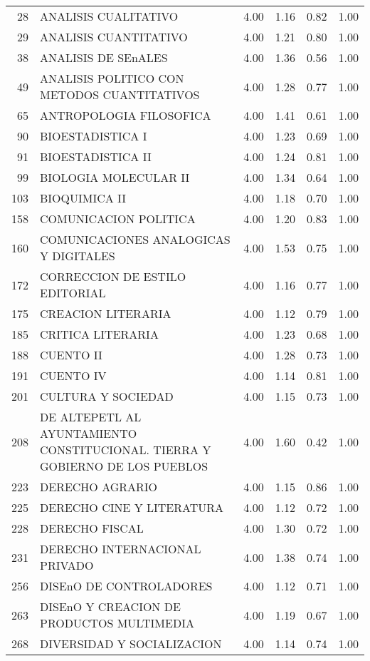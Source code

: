 \documentclass[12pt]{article}
\begin{document}
\begin{table}[ht]
\begin{tabular}{rlrrrr}
  28 & ANALISIS CUALITATIVO & 4.00 & 1.16 & 0.82 & 1.00 \\ 
  29 & ANALISIS CUANTITATIVO & 4.00 & 1.21 & 0.80 & 1.00 \\ 
  38 & ANALISIS DE SEnALES & 4.00 & 1.36 & 0.56 & 1.00 \\ 
  49 & ANALISIS POLITICO CON METODOS CUANTITATIVOS & 4.00 & 1.28 & 0.77 & 1.00 \\ 
  65 & ANTROPOLOGIA FILOSOFICA & 4.00 & 1.41 & 0.61 & 1.00 \\ 
  90 & BIOESTADISTICA I & 4.00 & 1.23 & 0.69 & 1.00 \\ 
  91 & BIOESTADISTICA II & 4.00 & 1.24 & 0.81 & 1.00 \\ 
  99 & BIOLOGIA MOLECULAR II & 4.00 & 1.34 & 0.64 & 1.00 \\ 
  103 & BIOQUIMICA II & 4.00 & 1.18 & 0.70 & 1.00 \\ 
  158 & COMUNICACION POLITICA & 4.00 & 1.20 & 0.83 & 1.00 \\ 
  160 & COMUNICACIONES ANALOGICAS Y DIGITALES & 4.00 & 1.53 & 0.75 & 1.00 \\ 
  172 & CORRECCION DE ESTILO EDITORIAL & 4.00 & 1.16 & 0.77 & 1.00 \\ 
  175 & CREACION LITERARIA & 4.00 & 1.12 & 0.79 & 1.00 \\ 
  185 & CRITICA LITERARIA & 4.00 & 1.23 & 0.68 & 1.00 \\ 
  188 & CUENTO II & 4.00 & 1.28 & 0.73 & 1.00 \\ 
  191 & CUENTO IV & 4.00 & 1.14 & 0.81 & 1.00 \\ 
  201 & CULTURA Y SOCIEDAD & 4.00 & 1.15 & 0.73 & 1.00 \\ 
  208 & DE ALTEPETL AL AYUNTAMIENTO CONSTITUCIONAL. TIERRA Y GOBIERNO DE LOS PUEBLOS & 4.00 & 1.60 & 0.42 & 1.00 \\ 
  223 & DERECHO AGRARIO & 4.00 & 1.15 & 0.86 & 1.00 \\ 
  225 & DERECHO CINE Y LITERATURA & 4.00 & 1.12 & 0.72 & 1.00 \\ 
  228 & DERECHO FISCAL & 4.00 & 1.30 & 0.72 & 1.00 \\ 
  231 & DERECHO INTERNACIONAL PRIVADO & 4.00 & 1.38 & 0.74 & 1.00 \\ 
  256 & DISEnO DE CONTROLADORES & 4.00 & 1.12 & 0.71 & 1.00 \\ 
  263 & DISEnO Y CREACION DE PRODUCTOS MULTIMEDIA & 4.00 & 1.19 & 0.67 & 1.00 \\ 
  268 & DIVERSIDAD Y SOCIALIZACION & 4.00 & 1.14 & 0.74 & 1.00 \\ 

\end{tabular}
\end{table}
\end{document}
